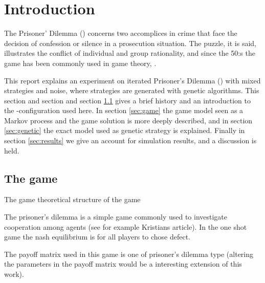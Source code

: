 \section{Introduction}\label{sec:intro}
The Prisoner' Dilemma (\pd) concerns two accomplices in crime that face the decision of confession or silence in a prosecution situation. The puzzle, it is said, illustrates the conflict of individual and group rationality, and since the 50:s the game has been commonly used in game theory, \cite{stanford:pd}.\mypar


This report explains an experiment on iterated Prisoner's Dilemma (\pd) with mixed strategies and noise, where strategies are generated with genetic algorithms. This section and section and section \ref{sec:intro:game} gives a brief history and an introduction to the \pd-configuration used here. In section \ref{sec:game} the game model seen as a Markov process and the game solution is more deeply described, and in section \ref{sec:genetic} the exact model used as genetic strategy is explained. Finally in section \ref{sec:results} we give an account for simulation results, and a discussion is held.

\subsection{The game}\label{sec:intro:game}
The game theoretical structure of the game 

The prisoner's dilemma is a simple game commonly used to investigate cooperation among agents (see for example Kristians article). In the one shot game the nash equilibrium is for all players to chose defect. 





The payoff matrix used in this game is one of prisoner's dilemma type (altering the
parameters in the payoff matrix would be a interesting extension of
this work).  

